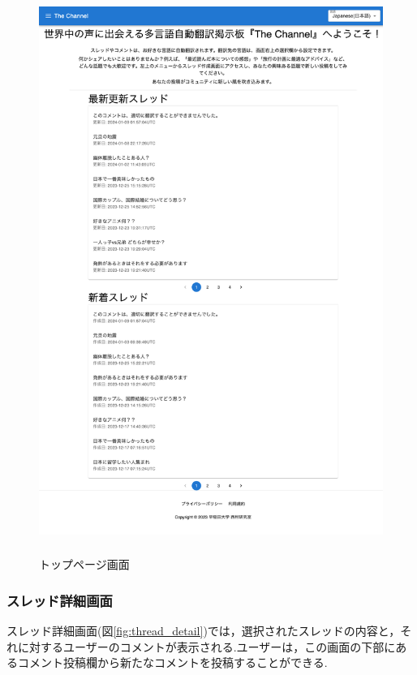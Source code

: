 \documentclass[b5paper,12pt,dvipdfmx]{jsreport}
\begin{document}
\begin{figure}[H]
	\centering
    \includegraphics[width=120mm,height=184.09mm]{./img/screen/top_page.png}
	\caption{トップページ画面}
	\label{fig:top_page}
\end{figure}


\subsubsection{スレッド詳細画面}
スレッド詳細画面(図\ref{fig:thread_detail})では，選択されたスレッドの内容と，それに対するユーザーのコメントが表示される.ユーザーは，この画面の下部にあるコメント投稿欄から新たなコメントを投稿することができる.
\end{document}
